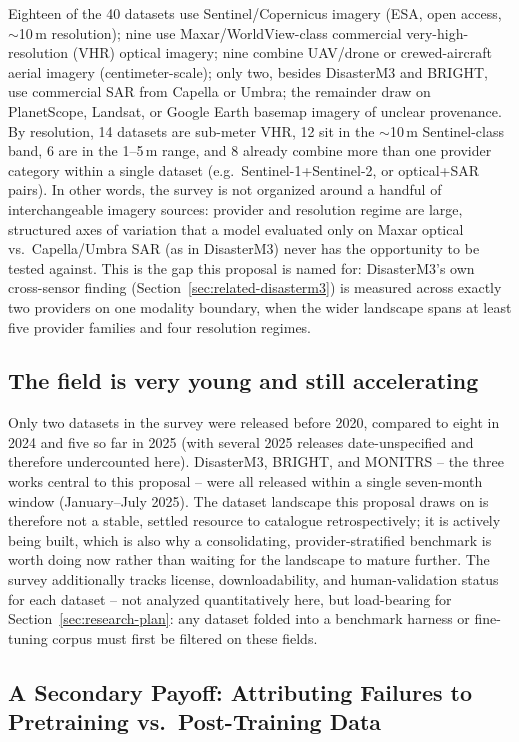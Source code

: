 Eighteen of the 40 datasets use Sentinel/Copernicus imagery (ESA, open
access, $\sim$10\,m resolution); nine use Maxar/WorldView-class commercial
very-high-resolution (VHR) optical imagery; nine combine UAV/drone or
crewed-aircraft aerial imagery (centimeter-scale); only two, besides
DisasterM3 and BRIGHT, use commercial SAR from Capella or Umbra; the
remainder draw on PlanetScope, Landsat, or Google Earth basemap imagery of
unclear provenance. By resolution, 14 datasets are sub-meter VHR, 12 sit in
the $\sim$10\,m Sentinel-class band, 6 are in the 1--5\,m range, and 8 already
combine more than one provider category within a single dataset (e.g.\
Sentinel-1+Sentinel-2, or optical+SAR pairs). In other words, the survey is
not organized around a handful of interchangeable imagery sources: provider
and resolution regime are large, structured axes of variation that a model
evaluated only on Maxar optical vs.\ Capella/Umbra SAR (as in DisasterM3)
never has the opportunity to be tested against. This is the gap this
proposal is named for: DisasterM3's own cross-sensor finding
(Section~\ref{sec:related-disasterm3}) is measured across exactly two
providers on one modality boundary, when the wider landscape spans at least
five provider families and four resolution regimes.

\subsection{The field is very young and still accelerating}

Only two datasets in the survey were released before 2020, compared to eight
in 2024 and five so far in 2025 (with several 2025 releases date-unspecified
and therefore undercounted here). DisasterM3, BRIGHT, and MONITRS -- the
three works central to this proposal -- were all released within a single
seven-month window (January--July 2025). The dataset landscape this proposal
draws on is therefore not a stable, settled resource to catalogue
retrospectively; it is actively being built, which is also why a
consolidating, provider-stratified benchmark is worth doing now rather than
waiting for the landscape to mature further. The survey additionally tracks
license, downloadability, and human-validation status for each dataset --
not analyzed quantitatively here, but load-bearing for
Section~\ref{sec:research-plan}: any dataset folded into a benchmark harness
or fine-tuning corpus must first be filtered on these fields.

\subsection{A Secondary Payoff: Attributing Failures to Pretraining vs.\ Post-Training Data}
\label{sec:attribution-problem}

